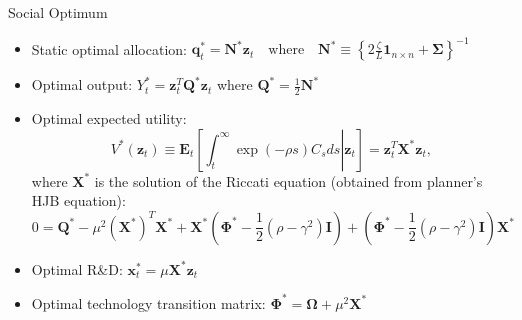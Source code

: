 \documentclass[
  10pt,               %
  aspectratio=169,     %
]{beamer}
\theoremstyle{plain}
\begin{document}
\begin{frame}{Social Optimum }

  \label{optimal}
  \begin{itemize}
    \item Static optimal allocation: $\bm{q}_{t}^{*}=\bm{N}^{*}\bm{z}_{t}\quad\text{where}\quad \bm{N}^{*}\equiv\left\{ 2\frac{\zeta}{L}\bm{1}_{n\times n}+\bm{\Sigma}\right\} ^{-1}$
    \item Optimal output: $Y_{t}^{*}=\bm{z}_{t}^{T}\bm{Q}^{*}\bm{z}_{t}$
          where $\bm{Q}^{*}=\frac{1}{2}\bm{N}^{*}$
    \item Optimal expected utility:
          \[
            V^{*}\left(\bm{z}_{t}\right)\equiv\bm{E}_{t}\left[\left.\int_{t}^{\infty}\exp\left(-\rho s\right)C_{s}ds\right|\bm{z}_{t}\right]=\bm{z}_{t}^{T}\bm{X}^{*}\bm{z}_{t},
          \]
          where $\bm{X}^{*}$ is the solution of the Riccati equation (obtained
          from planner's HJB equation):
          \[
            0=\bm{Q}^{*}-\mu^{2}(\bm{X}^*)^T\bm{X}^*+\bm{X}^{*}\left(\bm{\Phi}^{*}-\frac{1}{2}\left(\rho-\gamma^{2}\right)\bm{I}\right)+\left(\bm{\Phi}^{*}-\frac{1}{2}\left(\rho-\gamma^{2}\right)\bm{I}\right)\bm{X}^{*}
          \]
    \item Optimal R\&D: $\bm{x}_{t}^{*}=\mu\bm{X}^{*}\bm{z}_{t}$
    \item Optimal technology transition matrix: $\bm{\Phi}^{*}=\bm{\Omega}+\mu^{2}\bm{X}^{*}$
  \end{itemize}
  \hyperlink{aggregation}{}
\end{frame}
\end{document}
